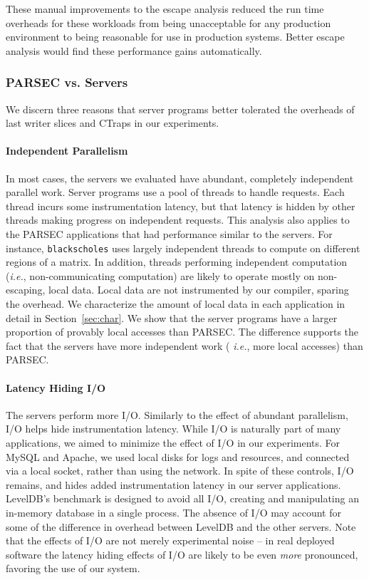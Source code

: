 \documentclass[preprint,10pt]{sigplanconf}
\newcommand{\ctraps}{CTraps\xspace}
\begin{document}
These manual improvements to the escape analysis reduced the run time overheads
for these workloads from being unacceptable for any production environment to
being reasonable for use in production systems. Better escape analysis would
find these performance gains automatically.


\subsubsection{PARSEC vs. Servers}
\label{sec:eval:parsecserver}
We discern three reasons that server programs better tolerated the overheads of
last writer slices and \ctraps in our experiments.

\paragraph{Independent Parallelism}
In most cases, the servers we evaluated have abundant, completely independent
parallel work.  Server programs use a pool of threads to handle requests.
Each thread incurs some instrumentation latency, but that latency is hidden by
other threads making progress on independent requests.  This analysis also
applies to the PARSEC applications that had performance similar to the servers.
For instance, {\tt blackscholes} uses largely independent threads to compute on
different regions of a matrix.  In addition, threads performing independent
computation ({\em i.e.}, non-communicating computation) are likely to operate
mostly on non-escaping, local data.  Local data are not instrumented by our
compiler, sparing the overhead.  We characterize the amount of local data in
each application in detail in Section~\ref{sec:char}.  We show that the server
programs have a larger proportion of provably local accesses than PARSEC.  The
difference supports the fact that the servers have more independent work ({\em
i.e.}, more local accesses) than PARSEC. 


\paragraph{Latency Hiding I/O}
The servers perform more I/O.  Similarly to the effect of abundant parallelism,
I/O helps hide instrumentation latency.  While I/O is naturally part of many
applications, we aimed to minimize the effect of I/O in our experiments.  For
MySQL and Apache, we used local disks for logs and resources, and connected via
a local socket, rather than using the network.  In spite of these controls, I/O
remains, and hides added instrumentation latency in our server applications.
LevelDB's benchmark is designed to avoid all I/O, creating and manipulating an
in-memory database in a single process.  The absence of I/O may account for some
of the difference in overhead between LevelDB and the other servers.  Note that
the effects of I/O are not merely experimental noise -- in real deployed
software the latency hiding effects of I/O are likely to be even {\em more}
pronounced, favoring the use of our system.
\end{document}
